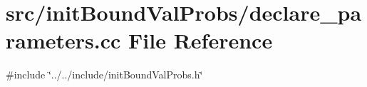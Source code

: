 \section{src/init\+Bound\+Val\+Probs/declare\+\_\+parameters.cc File Reference}
\label{init_bound_val_probs_2declare__parameters_8cc}
{\ttfamily \#include \char`\"{}../../include/init\+Bound\+Val\+Probs.\+h\char`\"{}}\newline
